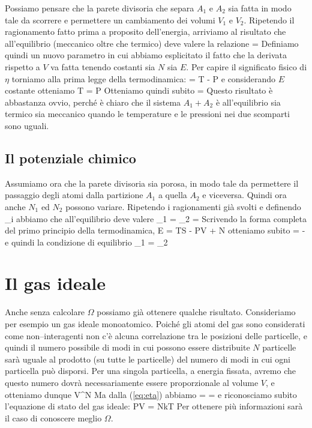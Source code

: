 Possiamo pensare che la parete divisoria che separa $A_{1}$ e $A_{2}$ sia fatta in modo tale da scorrere e permettere un cambiamento dei volumi $V_{1}$ e $V_{2}$. Ripetendo il ragionamento fatto prima a proposito dell'energia, arriviamo al risultato che all'equilibrio (meccanico oltre che termico) deve valere la relazione
\be
\label{eq:omegavolume}
 = 
\ee
Definiamo quindi un nuovo parametro
\be
\eta \equiv {}
\ee
in cui abbiamo esplicitato il fatto che la derivata rispetto a $V$ va fatta tenendo costanti sia $N$ sia $E$. Per capire il significato fisico di $\eta$ torniamo alla prima legge della termodinamica:
\be
{} = T - P
\ee
e considerando $E$ costante otteniamo
\be
T = P
\ee
Otteniamo quindi subito
\be
\label{eq:eta}
\eta = 
\ee
Questo risultato è abbastanza ovvio, perché è chiaro che il sistema $A_{1}+A_{2}$ è all'equilibrio sia termico sia meccanico quando le temperature e le pressioni nei due scomparti sono uguali.

\subsection{Il potenziale chimico}

Assumiamo ora che la parete divisoria sia porosa, in modo tale da permettere il passaggio degli atomi dalla partizione $A_1$ a quella $A_2$ e viceversa. Quindi ora anche $N_1$ ed $N_2$ possono variare. Ripetendo i ragionamenti già svolti e definendo
\be
\zeta_i \equiv {}
\ee
abbiamo che all'equilibrio deve valere
\be
\zeta_1 = \zeta_2 = \zeta
\ee
Scrivendo la forma completa del primo principio della termodinamica,
\be
\de E = T\de S - P\de V + \mu\de N
\ee
otteniamo subito
\be
\zeta = -
\ee
e quindi la condizione di equilibrio
\be
\mu_1 = \mu_2
\ee

\section{Il gas ideale}

Anche senza calcolare $\Omega$ possiamo già ottenere qualche risultato. Consideriamo per esempio un gas ideale monoatomico. Poiché gli atomi del gas sono considerati come non--interagenti non c'è alcuna correlazione tra le posizioni delle particelle, e quindi il numero possibile di modi in cui possono essere distribuite $N$ particelle sarà uguale al prodotto (su tutte le particelle) del numero di modi in cui ogni particella può disporsi. Per una singola particella, a energia fissata, avremo che questo numero dovrà necessariamente essere proporzionale al volume $V$, e otteniamo dunque
\be
\Omega \propto V^{N}
\ee
Ma dalla (\ref{eq:eta}) abbiamo
\be
{} =  = 
\ee
e riconosciamo subito l'equazione di stato del gas ideale:
\be
PV = NkT
\ee
Per ottenere più informazioni sarà il caso di conoscere meglio $\Omega$.

